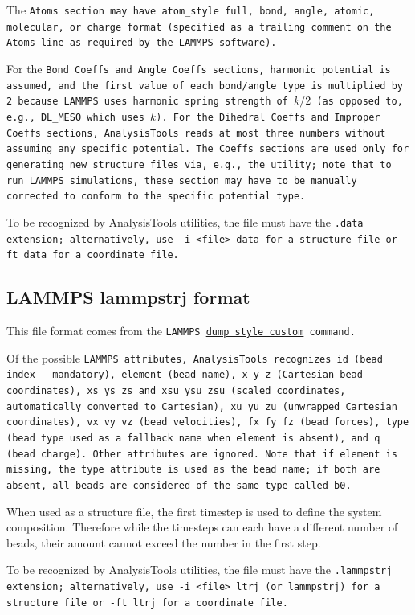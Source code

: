 The \tt{Atoms} section may have \tt{atom_style full}, \tt{bond}, \tt{angle},
\tt{atomic}, \tt{molecular}, or \tt{charge} format (specified as a trailing
comment on the \tt{Atoms} line as required by the \tt{LAMMPS} software).

For the \tt{Bond Coeffs} and \tt{Angle Coeffs} sections, harmonic potential is
assumed, and the first value of each bond/angle type is multiplied by 2 because
LAMMPS uses harmonic spring strength of $k/2$ (as opposed to, e.g., DL_MESO
which uses $k$). For the \tt{Dihedral Coeffs} and \tt{Improper Coeffs} sections,
AnalysisTools reads at most three numbers without assuming any specific
potential. The \tt{Coeffs} sections are used only for generating new structure
files via, e.g., the  utility; note that to run \tt{LAMMPS}
simulations, these section may have to be manually corrected to conform to the
specific potential type.

To be recognized by AnalysisTools utilities, the file must have the
\tt{.data} extension; alternatively, use \tt{-i <file> data} for a structure
file or \tt{-ft data} for a coordinate file. %

\subsection{LAMMPS lammpstrj format}\label{ssec:StructLtrj} %

This file format comes from the \tt{LAMMPS}
\href{https://docs.lammps.org/dump.html}{dump style custom} command.

Of the possible \tt{LAMMPS} attributes, AnalysisTools recognizes \tt{id}
(bead index -- mandatory), \tt{element} (bead name), \tt{x y z} (Cartesian
bead coordinates), \tt{xs ys zs} and \tt{xsu ysu zsu} (scaled coordinates,
automatically converted to Cartesian), \tt{xu yu zu} (unwrapped Cartesian
coordinates), \tt{vx vy vz} (bead velocities), \tt{fx fy fz} (bead forces),
\tt{type} (bead type used as a fallback name when \tt{element} is absent), and
\tt{q} (bead charge). Other attributes are ignored. Note that if \tt{element}
is missing, the \tt{type} attribute is used as the bead name; if both are
absent, all beads are considered of the same type called \tt{b0}.

When used as a structure file, the first timestep is used to define the system
composition. Therefore while the timesteps can each have a different number of
beads, their amount cannot exceed the number in the first step.

To be recognized by AnalysisTools utilities, the file must have the
\tt{.lammpstrj} extension; alternatively, use \tt{-i <file> ltrj} (or
\tt{lammpstrj}) for a structure file or \tt{-ft ltrj} for a coordinate file. %

